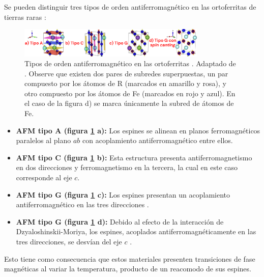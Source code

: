 \documentclass[../main.tex]{subfiles}
\begin{document}
Se pueden distinguir tres tipos de orden antiferromagnético en las ortoferritas de tierras raras \cite{KamalWarshi2018}:
\begin{figure}[H]
    \centering
    \includegraphics[width=0.8\textwidth]{fig/tiposAFM.png}
    \caption{Tipos de orden antiferromagnético en las ortoferritas . Adaptado de \cite{Wang2019}. Observe que existen dos pares de subredes superpuestas, un par compuesto por los átomos de R (marcados en amarillo y rosa), y otro compuesto por los átomos de Fe (marcados en rojo y azul). En el caso de la figura d) se marca únicamente la subred de átomos de Fe.}
    \label{fig:tiposAFM}
\end{figure}
\begin{itemize}
    \item \textbf{AFM tipo A (figura \ref{fig:tiposAFM} a):} Los espines se alinean en planos ferromagnéticos paralelos al plano $ab$ con acoplamiento antiferromagnético entre ellos.
    \item \textbf{AFM tipo C (figura \ref{fig:tiposAFM} b):} Esta estructura presenta antiferromagnetismo en dos direcciones y ferromagnetismo en la tercera, la cual en este caso corresponde al eje $c$.
    \item \textbf{AFM tipo G (figura \ref{fig:tiposAFM} c):} Los espines presentan un acoplamiento antiferromagnético en las tres direcciones \cite{Dagotto}.
    \item \textbf{AFM tipo G (figura \ref{fig:tiposAFM} d):} Debido al efecto de la interacción de Dzyaloshinskii-Moriya, los espines, acoplados antiferromagnéticamente en las tres direcciones, se desvían del eje $c$ \cite{Wang2019}.
\end{itemize}
Esto tiene como consecuencia que estos materiales presenten transiciones de fase magnéticas al variar la temperatura, producto de un reacomodo de sus espines.
\end{document}

